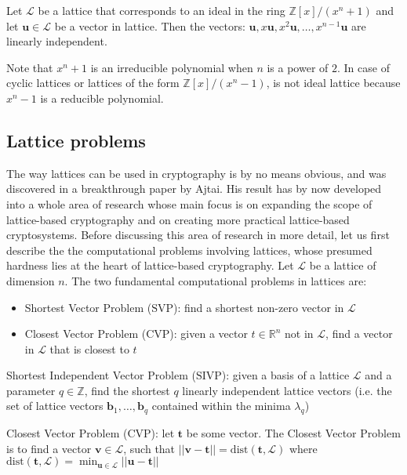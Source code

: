 \begin{theorem}
\normalfont
Let $\mathcal{L}$ be a lattice that corresponds to an ideal in the ring $\mathbb{Z}[x]/( x^n + 1 )$ and let $\textbf{u} \in \mathcal{L}$ be a vector in lattice. Then the vectors: $\textbf{u}, x\textbf{u}, x^2\textbf{u}, \dots, x^{n-1}\textbf{u}$ are linearly independent.
\end{theorem}

Note that $x^n + 1$ is an irreducible polynomial when $n$ is a power of $2$. In case of cyclic lattices or lattices of the form $\mathbb{Z}[x] / ( x^n - 1 )$, is not ideal lattice because $x^n - 1$ is a reducible polynomial.


\subsection{Lattice problems}
The way lattices can be used in cryptography is by no means obvious, and was discovered in a breakthrough paper by Ajtai. His result has by now developed into a whole area of research whose main focus is on expanding the scope of lattice-based cryptography and on creating more practical lattice-based cryptosystems. Before discussing this area of research in more detail, let us first describe the the computational problems involving lattices, whose presumed hardness lies at the heart of lattice-based cryptography. Let $\mathcal{L}$ be a lattice of dimension $n$. The two fundamental computational problems in lattices are:

\begin{itemize}
    \item Shortest Vector Problem ($\mathrm{SVP}$): find a shortest non-zero vector in $\mathcal{L}$
    \item Closest Vector Problem ($\mathrm{CVP}$): given a vector $t \in \mathbb{R}^{n}$ not in $\mathcal{L}$, find a vector in $\mathcal{L}$ that is closest to $t$
\end{itemize}




\begin{definition}
\normalfont
Shortest Independent Vector Problem ($\mathrm{SIVP}$): given a basis of a lattice $\mathcal{L}$ and a parameter $q \in \mathbb{Z}$, find the shortest $q$ linearly independent lattice vectors (i.e. the set of lattice vectors $\textbf{b}_1, \dots, \textbf{b}_q$ contained within the minima $\lambda_q$)
\end{definition}


\begin{definition}
\normalfont
Closest Vector Problem ($\mathrm{CVP}$): let $\textbf{t}$ be some vector. The Closest Vector Problem is to find a vector $\textbf{v} \in \mathcal{L}$, such that $||\textbf{v} - \textbf{t}|| = \text{dist}(\textbf{t}, \mathcal{L})$ where $\text{dist}(\textbf{t}, \mathcal{L}) = \min_{\textbf{u} \in \mathcal{L}} ||\textbf{u} - \textbf{t}||$
\end{definition}


